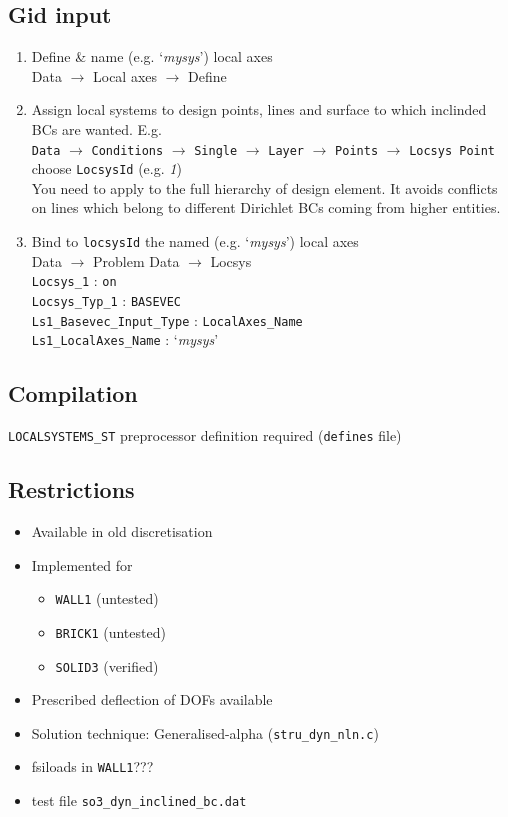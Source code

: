 \subsection{Gid input}
\begin{enumerate}
\item Define \& name (e.g. `\textit{mysys}') local axes\\
       Data $\to$ Local axes $\to$ Define
\item Assign local systems to design points, lines and surface to which
       inclinded BCs are wanted. E.g.\\
       \texttt{Data} $\to$ \texttt{Conditions} $\to$ \texttt{Single} $\to$ \texttt{Layer} $\to$ \texttt{Points} $\to$ \texttt{Locsys Point}\\
       choose \texttt{LocsysId} (e.g. \textit{1})\\
       You need to apply to the full hierarchy
       of design element. It avoids conflicts on lines which belong
       to different Dirichlet BCs coming from higher entities.
\item Bind to \texttt{locsysId} the named  (e.g. `\textit{mysys}') local axes\\
       Data $\to$ Problem Data $\to$ Locsys\\
       \texttt{Locsys\_1} : \texttt{on}\\
       \texttt{Locsys\_Typ\_1} : \texttt{BASEVEC}\\
       \texttt{Ls1\_Basevec\_Input\_Type} : \texttt{LocalAxes\_Name}\\
       \texttt{Ls1\_LocalAxes\_Name} : `\textit{mysys}'\\
\end{enumerate}

\subsection{Compilation}
\texttt{LOCALSYSTEMS\_ST} preprocessor definition required (\texttt{defines} file)

\subsection{Restrictions}
\begin{itemize}
\item Available in old discretisation
\item Implemented for 
   \begin{itemize}
   \item \texttt{WALL1} (untested)
   \item \texttt{BRICK1} (untested)
   \item \texttt{SOLID3} (verified)
   \end{itemize}
\item Prescribed deflection of DOFs available
\item Solution technique: Generalised-alpha (\texttt{stru\_dyn\_nln.c})
\item fsiloads in \texttt{WALL1}???
\item test file \texttt{so3\_dyn\_inclined\_bc.dat}
\end{itemize}